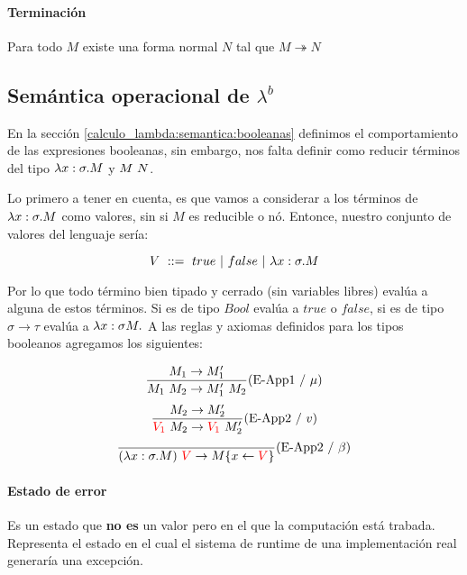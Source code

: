\paragraph{Terminación}
Para todo $M$ existe una forma normal $N$ tal que $M\twoheadrightarrow N$


\subsection{Semántica operacional de \texorpdfstring{$\lambda^b$}{lambda b}}
En la sección \ref{calculo_lambda:semantica:booleanas} definimos el comportamiento de las expresiones booleanas, sin embargo, nos falta definir como reducir términos del tipo $\lambda x: \sigma . M$ y $M~N$.

Lo primero a tener en cuenta, es que vamos a considerar a los términos de $\lambda x: \sigma . M$ como valores, sin si $M$ es reducible o nó. Entonce, nuestro conjunto de valores del lenguaje sería:

$$ V  ~::=~ true~|~false~|~\lambda x: \sigma . M$$

Por lo que todo término bien tipado y cerrado (sin variables libres) evalúa a alguna de estos términos. Si es de tipo $Bool$ evalúa a $true$ o $false$, si es de tipo $\sigma\to\tau$ evalúa a $\lambdaAbs{x}{\sigma{M}}$
A las reglas y axiomas definidos para los tipos booleanos agregamos los siguientes:

\begin{equation*}
	\frac{M_1\to M'_1}{M_1~M_2 \to 
		M'_1~M_2}(\text{E-App1}~ /~ \mu)
\end{equation*}
\vspace*{5mm}
\begin{equation*}
	\frac{M_2 \to M'_2}{\color{red}V_1\color{black}~M_2 \to 
		\color{red}V_1\color{black}~M'_2}(\text{E-App2}~/~v)
\end{equation*}	
\vspace*{5mm}
\begin{equation*}
	\frac{}{(\lambda x: \sigma . M)~\color{red}V\color{black} \to 
		M\{x\leftarrow\color{red}V\color{black}\}}(\text{E-App2}~/~\beta)
\end{equation*}

\paragraph{Estado de error} Es un estado que \textbf{no es} un valor pero en el que la computación está trabada. Representa el estado en el cual el sistema de runtime de una implementación real generaría una excepción.

